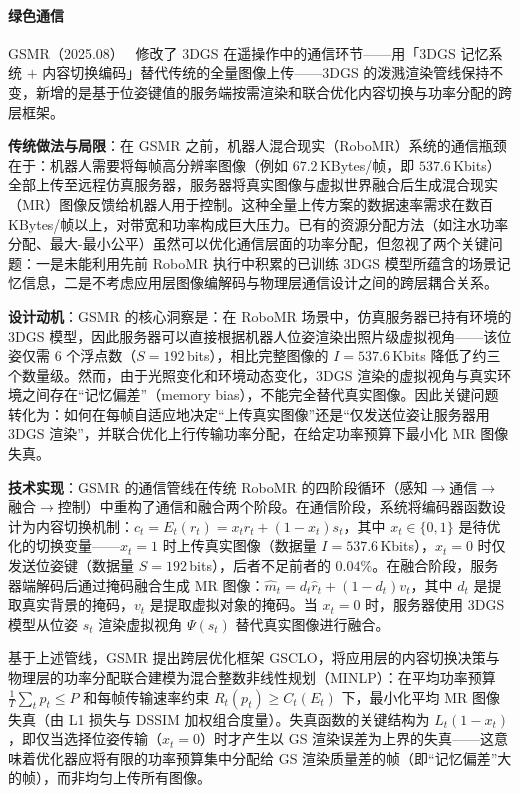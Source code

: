 \paragraph{绿色通信}

GSMR（2025.08）~\cite{2508_08624} 修改了 3DGS 在遥操作中的通信环节——用「3DGS 记忆系统 $+$ 内容切换编码」替代传统的全量图像上传——3DGS 的泼溅渲染管线保持不变，新增的是基于位姿键值的服务端按需渲染和联合优化内容切换与功率分配的跨层框架。

\textbf{传统做法与局限}：在 GSMR 之前，机器人混合现实（RoboMR）系统的通信瓶颈在于：机器人需要将每帧高分辨率图像（例如 $67.2$\,KBytes/帧，即 $537.6$\,Kbits）全部上传至远程仿真服务器，服务器将真实图像与虚拟世界融合后生成混合现实（MR）图像反馈给机器人用于控制。这种全量上传方案的数据速率需求在数百 KBytes/帧以上，对带宽和功率构成巨大压力。已有的资源分配方法（如注水功率分配、最大-最小公平）虽然可以优化通信层面的功率分配，但忽视了两个关键问题：一是未能利用先前 RoboMR 执行中积累的已训练 3DGS 模型所蕴含的场景记忆信息，二是不考虑应用层图像编解码与物理层通信设计之间的跨层耦合关系。

\textbf{设计动机}：GSMR 的核心洞察是：在 RoboMR 场景中，仿真服务器已持有环境的 3DGS 模型，因此服务器可以直接根据机器人位姿渲染出照片级虚拟视角——该位姿仅需 6 个浮点数（$S = 192$\,bits），相比完整图像的 $I = 537.6$\,Kbits 降低了约三个数量级。然而，由于光照变化和环境动态变化，3DGS 渲染的虚拟视角与真实环境之间存在``记忆偏差''（memory bias），不能完全替代真实图像。因此关键问题转化为：如何在每帧自适应地决定``上传真实图像''还是``仅发送位姿让服务器用 3DGS 渲染''，并联合优化上行传输功率分配，在给定功率预算下最小化 MR 图像失真。

\textbf{技术实现}：GSMR 的通信管线在传统 RoboMR 的四阶段循环（感知$\to$通信$\to$融合$\to$控制）中重构了通信和融合两个阶段。在通信阶段，系统将编码器函数设计为内容切换机制：$c_t = E_t(r_t) = x_t r_t + (1 - x_t) s_t$，其中 $x_t \in \{0, 1\}$ 是待优化的切换变量——$x_t = 1$ 时上传真实图像（数据量 $I = 537.6$\,Kbits），$x_t = 0$ 时仅发送位姿键（数据量 $S = 192$\,bits），后者不足前者的 $0.04\%$。在融合阶段，服务器端解码后通过掩码融合生成 MR 图像：$\hat{m}_t = d_t \hat{r}_t + (1 - d_t) v_t$，其中 $d_t$ 是提取真实背景的掩码，$v_t$ 是提取虚拟对象的掩码。当 $x_t = 0$ 时，服务器使用 3DGS 模型从位姿 $s_t$ 渲染虚拟视角 $\Psi(s_t)$ 替代真实图像进行融合。

基于上述管线，GSMR 提出跨层优化框架 GSCLO，将应用层的内容切换决策与物理层的功率分配联合建模为混合整数非线性规划（MINLP）：在平均功率预算 $\frac{1}{T}\sum_{t} p_t \leq P$ 和每帧传输速率约束 $R_t(p_t) \geq C_t(E_t)$ 下，最小化平均 MR 图像失真（由 L1 损失与 DSSIM 加权组合度量）。失真函数的关键结构为 $L_t(1 - x_t)$，即仅当选择位姿传输（$x_t = 0$）时才产生以 GS 渲染误差为上界的失真——这意味着优化器应将有限的功率预算集中分配给 GS 渲染质量差的帧（即``记忆偏差''大的帧），而非均匀上传所有图像。


